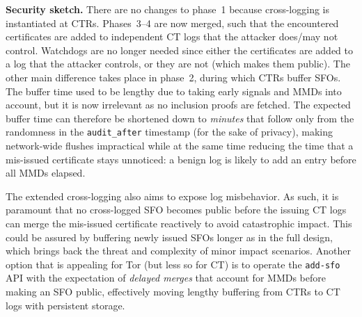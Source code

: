 \textbf{Security sketch.} 
There are no changes to phase~1 because cross-logging is instantiated at CTRs.
Phases~3--4 are now merged, such that the encountered certificates are added to
independent CT logs that the attacker does/may not control.  Watchdogs are no
longer needed since either the certificates are added to a log that the attacker
controls, or they are not (which makes them public).  The other main difference takes place in phase~2,
during which CTRs buffer SFOs.  The buffer time used to be lengthy due to taking
early signals and MMDs into account, but it is now irrelevant as no inclusion
proofs are fetched.  The expected buffer time can therefore be shortened down
to \emph{minutes} that follow only from the randomness in the
\texttt{audit\_after} timestamp (for the sake of privacy), making network-wide
flushes impractical while at the same time reducing the time that a mis-issued
certificate stays unnoticed:
	a benign log is likely to add an entry before all MMDs elapsed.

The extended cross-logging also aims to expose log misbehavior.  As such, it is
paramount that no cross-logged SFO becomes public before the issuing CT logs can
merge the mis-issued certificate reactively to avoid catastrophic impact. This
could be assured by buffering newly issued SFOs longer as in the full design,
which brings back the threat and complexity of minor impact scenarios. Another
option that is appealing for Tor (but less so for CT) is to operate the
\texttt{add-sfo} API with the expectation of \emph{delayed merges} that account
for MMDs before making an SFO public, effectively moving lengthy buffering from
CTRs to CT logs with persistent storage.

